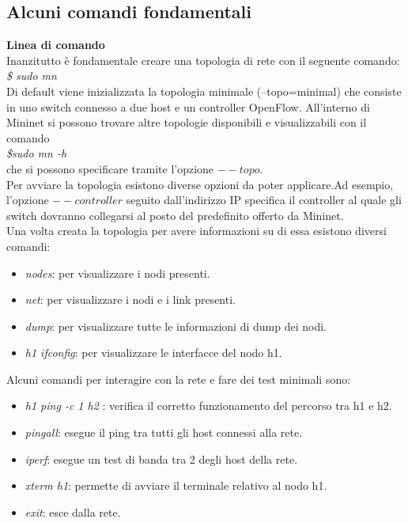 \subsection{Alcuni comandi fondamentali}
\textbf{Linea di comando}
\\Inanzitutto è fondamentale creare una topologia di rete con il seguente comando:
\\\textit{\$ sudo mn}
\\Di default viene inizializzata la topologia minimale (--topo=minimal) che consiste in uno switch connesso a due host e un controller OpenFlow.
All'interno di Mininet si possono trovare altre topologie disponibili e visualizzabili con il comando \\\textit{\$sudo mn -h} \\che si possono specificare tramite l'opzione $--topo$.
\\Per avviare la topologia esistono diverse opzioni da poter applicare.Ad esempio, l'opzione $--controller$ seguito dall'indirizzo IP specifica il controller al quale gli switch dovranno collegarsi al posto 
del predefinito offerto da Mininet.
\\Una volta creata la topologia per avere informazioni su di essa esistono diversi comandi:
\begin{itemize}
    \item \textit{ nodes}: per visualizzare i nodi presenti.
    \item \textit{ net}: per visualizzare i nodi e i link presenti.
    \item \textit{ dump}: per visualizzare tutte le informazioni di dump dei nodi.
    \item \textit{h1 ifconfig}: per visualizzare le interfacce del nodo h1.
\end{itemize}

Alcuni comandi per interagire con la rete e fare dei test minimali sono:
\begin{itemize}
    \item \textit{ h1 ping -c 1 h2 }: verifica il corretto funzionamento del percorso tra h1 e h2.
    \item \textit{ pingall}: esegue il ping tra tutti gli host connessi alla rete.
    \item \textit{ iperf}: esegue un test di banda tra 2 degli host della rete.
    \item \textit{xterm h1}: permette di avviare il terminale relativo al nodo h1.
    \item \textit{exit}: esce dalla rete.
\end{itemize}

